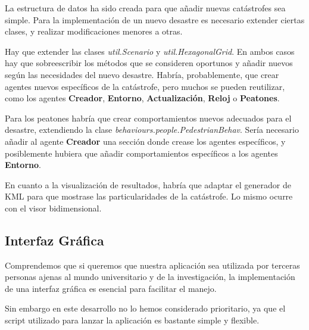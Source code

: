 La estructura de datos ha sido creada para que añadir nuevas catástrofes sea
simple. Para la implementación de un nuevo desastre es necesario extender
ciertas clases, y realizar modificaciones menores a otras.

Hay que extender las clases {\em util.Scenario} y {\em util.HexagonalGrid}. En
ambos casos hay que sobreescribir los métodos que se consideren oportunos y
añadir nuevos según las necesidades del nuevo desastre. Habría, probablemente,
que crear agentes nuevos específicos de la catástrofe, pero muchos se pueden
reutilizar, como los agentes {\bf Creador}, {\bf Entorno}, {\bf Actualización},
{\bf Reloj} o {\bf Peatones}.

Para los peatones habría que crear comportamientos nuevos adecuados para el
desastre, extendiendo la clase {\em behaviours.people.PedestrianBehav}. Sería
necesario añadir al agente {\bf Creador} una sección donde crease los agentes
específicos, y posiblemente hubiera que añadir comportamientos específicos a
los agentes {\bf Entorno}.

En cuanto a la visualización de resultados, habría que adaptar el generador de
KML para que mostrase las particularidades de la catástrofe. Lo mismo ocurre
con el visor bidimensional.

\subsection*{Interfaz Gráfica}

Comprendemos que si queremos que nuestra aplicación sea utilizada por terceras
personas ajenas al mundo universitario y de la investigación, la implementación
de una interfaz gráfica es esencial para facilitar el manejo.

Sin embargo en este desarrollo no lo hemos considerado prioritario, ya que
el script utilizado para lanzar la aplicación es bastante simple y flexible.

